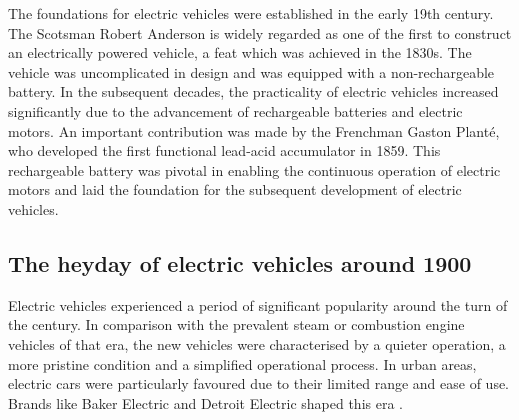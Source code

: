 The foundations for electric vehicles were established in the early 19th century. The Scotsman Robert Anderson is widely regarded as one of the first to construct an electrically powered vehicle, a feat which was achieved in the 1830s. The vehicle was uncomplicated in design and was equipped with a non-rechargeable battery. In the subsequent decades, the practicality of electric vehicles increased significantly due to the advancement of rechargeable batteries and electric motors.\autocite{vattenfall_elektroauto_geschichte} 
An important contribution was made by the Frenchman Gaston Planté, who developed the first functional lead-acid accumulator in 1859. This rechargeable battery was pivotal in enabling the continuous operation of electric motors and laid the foundation for the subsequent development of electric vehicles.\autocite{cosmos_gaston_plante}

\subsection*{The heyday of electric vehicles around 1900}

Electric vehicles experienced a period of significant popularity around the turn of the century. In comparison with the prevalent steam or combustion engine vehicles of that era, the new vehicles were characterised by a quieter operation, a more pristine condition and a simplified operational process. In urban areas, electric cars were particularly favoured due to their limited range and ease of use.\autocite{energyprofi_elektromobile_geschichte} Brands like Baker Electric and Detroit Electric shaped this era \autocite{einfacheauto_elektroauto_geschichte}.

